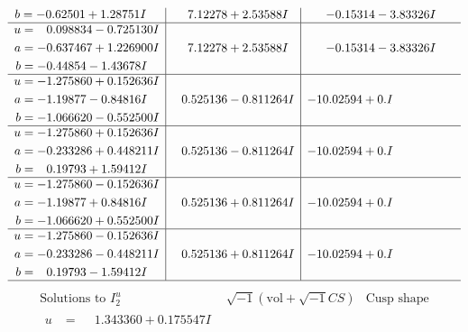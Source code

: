 \documentclass[1p]{elsarticle_modified}
\theoremstyle{definition}
\newcommand{\I}{\sqrt{-1}}
\begin{document}
$$\begin{array}{c|c|c}
\begin{aligned}
b &= -0.62501 + 1.28751 I\end{aligned}
 & \phantom{-}7.12278 + 2.53588 I & -0.15314 - 3.83326 I \\ \hline\begin{aligned}
u &= \phantom{-}0.098834 - 0.725130 I \\
a &= -0.637467 + 1.226900 I \\
b &= -0.44854 - 1.43678 I\end{aligned}
 & \phantom{-}7.12278 + 2.53588 I & -0.15314 - 3.83326 I \\ \hline\begin{aligned}
u &= -1.275860 + 0.152636 I \\
a &= -1.19877 - 0.84816 I \\
b &= -1.066620 - 0.552500 I\end{aligned}
 & \phantom{-}0.525136 - 0.811264 I & -10.02594 + 0. I\phantom{ +0.000000I} \\ \hline\begin{aligned}
u &= -1.275860 + 0.152636 I \\
a &= -0.233286 + 0.448211 I \\
b &= \phantom{-}0.19793 + 1.59412 I\end{aligned}
 & \phantom{-}0.525136 - 0.811264 I & -10.02594 + 0. I\phantom{ +0.000000I} \\ \hline\begin{aligned}
u &= -1.275860 - 0.152636 I \\
a &= -1.19877 + 0.84816 I \\
b &= -1.066620 + 0.552500 I\end{aligned}
 & \phantom{-}0.525136 + 0.811264 I & -10.02594 + 0. I\phantom{ +0.000000I} \\ \hline\begin{aligned}
u &= -1.275860 - 0.152636 I \\
a &= -0.233286 - 0.448211 I \\
b &= \phantom{-}0.19793 - 1.59412 I\end{aligned}
 & \phantom{-}0.525136 + 0.811264 I & -10.02594 + 0. I\phantom{ +0.000000I}\\
 \hline 
 \end{array}$$\newpage$$\begin{array}{c|c|c}  
\text{Solutions to }I^u_{2}& \I (\text{vol} + \sqrt{-1}CS) & \text{Cusp shape}\\
 \hline 
\begin{aligned}
u &= \phantom{-}1.343360 + 0.175547 I \\

\end{aligned}
\end{array}$$
\end{document}
